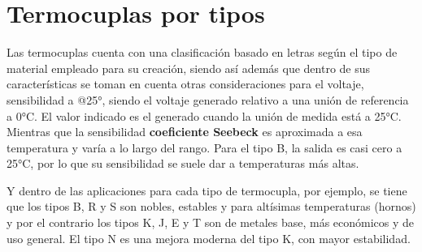 \section*{Termocuplas por tipos}
Las termocuplas cuenta con una clasificación basado en letras según el tipo de material empleado para su creación, siendo así además que dentro de sus características se toman en cuenta otras consideraciones para el voltaje, sensibilidad a @25°, siendo el voltaje generado relativo a una unión de referencia a 0°C. El valor indicado es el generado cuando la unión de medida está a 25°C.
Mientras que la sensibilidad \textbf{coeficiente Seebeck} es aproximada a esa temperatura y varía a lo largo del rango. Para el tipo B, la salida es casi cero a 25°C, por lo que su sensibilidad se suele dar a temperaturas más altas.

Y dentro de las aplicaciones para cada tipo de termocupla, por ejemplo, se tiene que los tipos B, R y S son nobles, estables y para altísimas temperaturas (hornos) y por el contrario los tipos K, J, E y T son de metales base, más económicos y de uso general. El tipo N es una mejora moderna del tipo K, con mayor estabilidad.

